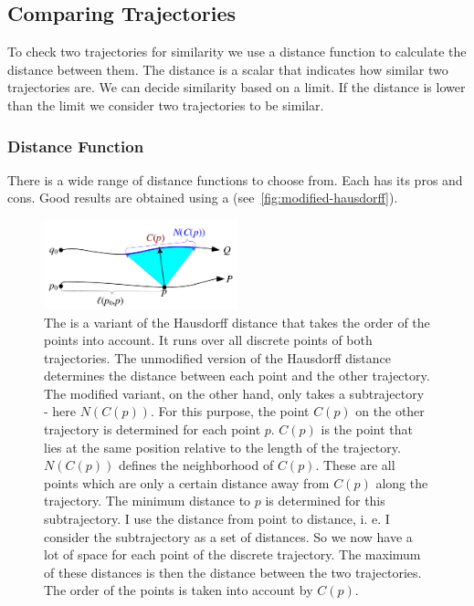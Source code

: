 \subsection{Comparing Trajectories}\label{subsec:comparingTrajectories}
To check two trajectories for similarity we use a distance function to calculate the distance between them.
The distance is a scalar that indicates how similar two trajectories are.
We can decide similarity based on a limit.
If the distance is lower than the limit we consider two trajectories to be similar.

\subsubsection{Distance Function}
There is a wide range of distance functions to choose from.
Each has its pros and cons.
Good results are obtained using a \modifiedHausdorffDistFn (see~\autoref{fig:modified-hausdorff}).

\begin{figure}[!htbp]
    \centering
    \includegraphics[width=0.5\textwidth]{pictures/modified-hausdorff-distance.png}
    \caption{
    The \modifiedHausdorffDistFn is a variant of the Hausdorff distance that takes the order of the points into account.
    It runs over all discrete points of both trajectories.
    The unmodified version of the Hausdorff distance determines the distance between each point and the other trajectory.
    The modified variant, on the other hand, only takes a subtrajectory - here \(N(C(p))\).
    For this purpose, the point \(C(p)\) on the other trajectory is determined for each point \(p\). \(C(p)\) is the point that lies at the same position relative to the length of the trajectory.
    \(N(C(p))\) defines the neighborhood of \(C(p)\). These are all points which are only a certain distance away from \(C(p)\) along the trajectory.
    The minimum distance to \(p\) is determined for this subtrajectory. I use the distance from point to distance, i. e. I consider the subtrajectory as a set of distances.
    So we now have a lot of space for each point of the discrete trajectory.
    The maximum of these distances is then the distance between the two trajectories.
    The order of the points is taken into account by \(C(p)\).
    }
    \label{fig:modified-hausdorff}
\end{figure}

